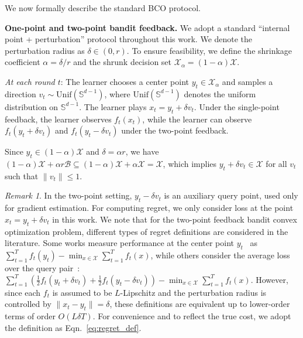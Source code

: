 \documentclass[journal,onecolumn]{IEEEtran}
\newcommand{\cB}{\mathcal{B}}
\newcommand{\cX}{\mathcal{X}}
\theoremstyle{plain}
\theoremstyle{definition}
\theoremstyle{remark}
\newtheorem{remark}[theorem]{Remark}
\begin{document}
We now formally describe the standard BCO protocol. %

\textbf{One-point and two-point bandit feedback.}
We adopt a standard ``internal point + perturbation'' protocol throughout this work.
We denote the perturbation radius as $\delta\in(0,r)$. To ensure feasibility, we
define the shrinkage coefficient $\alpha=\delta/r$ and the shrunk decision set
$\cX_{\alpha}=(1-\alpha)\cX$.

\emph{At each round $t$}: The learner chooses a center point $y_{t}\in\cX_{\alpha}$ and samples a direction
$v_{t}\sim \text{Unif}(\mathbb{S}^{d-1})$, where $\text{Unif}(\mathbb S^{d-1})$ denotes the uniform distribution on
$\mathbb S^{d-1}$. The learner plays $x_{t}=y_{t}+\delta v_{t}$. Under the single-point feedback, the learner observes $f_{t}(x_{t})$, while the learner can observe $f_{t}(y_{t}+\delta v_{t})$ and $f_{t}(y_{t}-\delta v_{t})$ under the two-point feedback.

Since $y_{t}\in(1-\alpha)\cX$ and $\delta=\alpha r$, we have $(1-\alpha)\cX+\alpha r \cB \subseteq (1-\alpha)\cX+\alpha \cX=\cX$, which implies $y_{t}+\delta v_{t}\in \cX$ for all $v_t$ such that $\|v_{t}\|\leq 1$.
\begin{remark}
    In the two-point setting, $y_{t}-\delta v_{t}$ is an auxiliary query point, used only for gradient estimation. For computing regret, we only consider loss at the point $x_t = y_t + \delta v_t$ in this work. 
    We note that for the two-point feedback bandit convex optimization problem, different types of regret definitions
    are considered in the literature. Some works measure performance at the
    center point $y_{t}$~\citep{shamir2017optimal} as $\sum_{t=1}^{T}f_{t}(y_{t})
    - \min_{x \in \cX}\sum_{t=1}^{T}f_{t}(x)$, while others consider the average
    loss over the query pair~\citep{zhao2021bandit}:
    $\sum_{t=1}^{T}\left(\frac{1}{2}f_{t}(y_{t}+\delta v_{t}) + \frac{1}{2}f_{t}(
    y_{t}-\delta v_{t})\right) - \min_{x \in \cX}\sum_{t=1}^{T}f_{t}(x)$. However,
    since each $f_{t}$ is assumed to be $L$-Lipschitz and the perturbation
    radius is controlled by $\|x_{t}- y_{t}\| = \delta$, these definitions are equivalent
    up to lower-order terms of order $O(L \delta T)$. For convenience and to
    reflect the true cost, we adopt the definition as Eqn.~\eqref{eq:regret_def}.
\end{remark}
\end{document}
